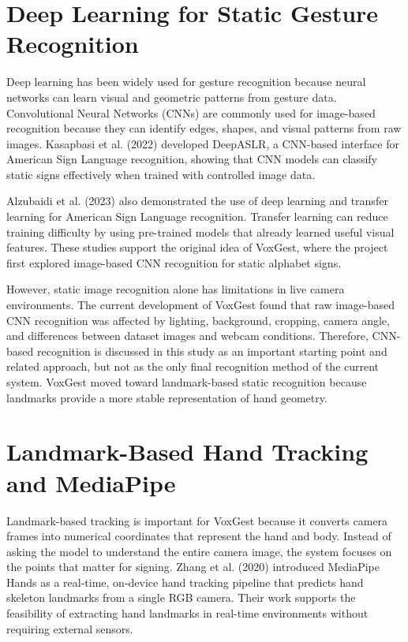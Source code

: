 \section{Deep Learning for Static Gesture Recognition}

Deep learning has been widely used for gesture recognition because neural networks can learn visual and geometric patterns from gesture data. Convolutional Neural Networks (CNNs) are commonly used for image-based recognition because they can identify edges, shapes, and visual patterns from raw images. Kasapbasi et al. (2022) developed DeepASLR, a CNN-based interface for American Sign Language recognition, showing that CNN models can classify static signs effectively when trained with controlled image data.

Alzubaidi et al. (2023) also demonstrated the use of deep learning and transfer learning for American Sign Language recognition. Transfer learning can reduce training difficulty by using pre-trained models that already learned useful visual features. These studies support the original idea of VoxGest, where the project first explored image-based CNN recognition for static alphabet signs.

However, static image recognition alone has limitations in live camera environments. The current development of VoxGest found that raw image-based CNN recognition was affected by lighting, background, cropping, camera angle, and differences between dataset images and webcam conditions. Therefore, CNN-based recognition is discussed in this study as an important starting point and related approach, but not as the only final recognition method of the current system. VoxGest moved toward landmark-based static recognition because landmarks provide a more stable representation of hand geometry.

\section{Landmark-Based Hand Tracking and MediaPipe}

Landmark-based tracking is important for VoxGest because it converts camera frames into numerical coordinates that represent the hand and body. Instead of asking the model to understand the entire camera image, the system focuses on the points that matter for signing. Zhang et al. (2020) introduced MediaPipe Hands as a real-time, on-device hand tracking pipeline that predicts hand skeleton landmarks from a single RGB camera. Their work supports the feasibility of extracting hand landmarks in real-time environments without requiring external sensors.

